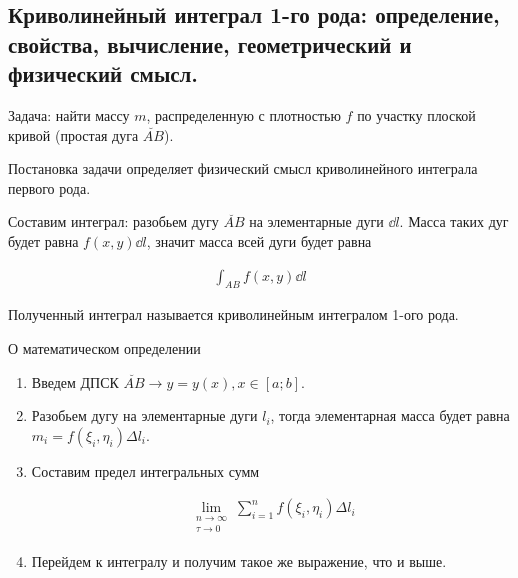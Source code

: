 \subsection{%
  Криволинейный интеграл 1-го рода: определение, свойства, вычисление,
  геометрический и физический смысл.%
}

Задача: найти массу \(m\), распределенную с плотностью \(f\) по
участку плоской кривой (простая дуга \(\breve{AB}\)).

\begin{remark}
  Постановка задачи определяет физический смысл криволинейного интеграла первого
  рода.
\end{remark}

Составим интеграл: разобьем дугу \(\breve{AB}\) на элементарные
дуги \(\dd l\). Масса таких дуг будет равна \(f(x, y) \dd l\), значит масса всей
дуги будет равна

\begin{align*}
  \int_{AB} f(x, y) \dd l
\end{align*}

Полученный интеграл называется криволинейным интегралом 1-ого рода.

\begin{remark}
  О математическом определении

  \begin{enumerate}
    \item Введем ДПСК \(\breve{AB} \to y = y(x), x \in [a; b]\).
    \item Разобьем дугу на элементарные дуги \(l_{i}\),
      тогда элементарная масса будет равна
      \(m_{i} = f(\xi_{i}, \eta_{i}) \Delta l_{i}\).
  
    \item Составим предел интегральных сумм
    
    \begin{align*}
      \lim_{\substack{n \to \infty \\ \tau \to 0}}
        \sum_{i = 1}^{n} f(\xi_{i}, \eta_{i}) \Delta l_{i}
    \end{align*}
    
    \item Перейдем к интегралу и получим такое же выражение, что и выше.
  \end{enumerate}
\end{remark}

